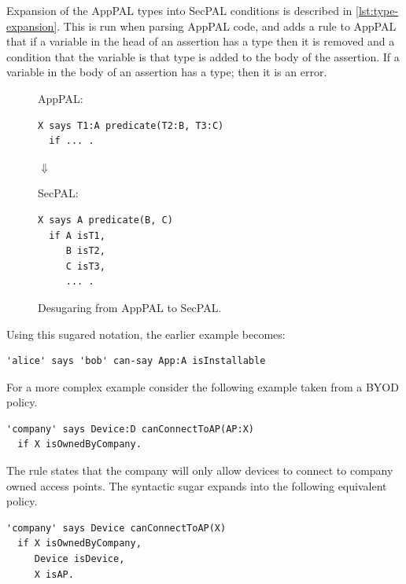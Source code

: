 \documentclass[thesis.tex]{subfiles}
\begin{document}
Expansion of the AppPAL types into SecPAL conditions is described in \autoref{lst:type-expansion}.
This is run when parsing AppPAL code, and adds a rule to AppPAL
  that if a variable in the head of an assertion has a type
  then it is removed and a condition that the variable is that type is added to the body of the assertion.
If a variable in the body of an assertion has a type; then it is an error.

\begin{figure}\centering
  AppPAL:
\begin{lstlisting}
X says T1:A predicate(T2:B, T3:C) 
  if ... .
\end{lstlisting}

  $\Downarrow$

  SecPAL:
\begin{lstlisting}
X says A predicate(B, C) 
  if A isT1, 
     B isT2, 
     C isT3, 
     ... .
\end{lstlisting}
  \caption{Desugaring from AppPAL to SecPAL.}
  \label{lst:type-expansion}
\end{figure}


Using this sugared notation, the earlier example becomes:
\begin{lstlisting}
'alice' says 'bob' can-say App:A isInstallable
\end{lstlisting}

For a more complex example consider the following example taken from a BYOD policy.
\begin{lstlisting}
'company' says Device:D canConnectToAP(AP:X)
  if X isOwnedByCompany.
\end{lstlisting}

The rule states that the company will only allow devices to connect to company owned access points.
The syntactic sugar expands into the following equivalent policy.

\begin{lstlisting}
'company' says Device canConnectToAP(X)
  if X isOwnedByCompany,
     Device isDevice,
     X isAP.
\end{lstlisting}
\end{document}

